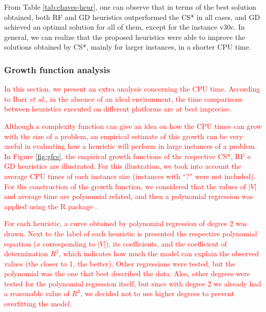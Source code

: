 \documentclass{ro}
\begin{document}
From Table \ref{tab:chaves-heur}, one can observe that in terms of the best solution obtained,  both RF and GD heuristics outperformed the CS* in all cases, and GD achieved an optimal solution for all of them, except for the instance v30c. In general, we can realize that the proposed heuristics were able to improve the solutions obtained by CS*, mainly for  larger instances, in a shorter CPU time.


\subsubsection{Growth function analysis}

\textcolor{red}{In this section, we present an extra analysis concerning the CPU time. According to Barr \textit{et al.}\cite{barr2001guidelines}, in the absence of an ideal environment, the time comparisons between heuristics executed on different platforms are at best imprecise.}

\textcolor{red}{
Although a complexity function can give an idea on how the CPU times can grow with the size of a problem, an empirical estimate of this growth can be very useful in evaluating how a heuristic will perform in large instances of a problem. In Figure \ref{fig:gfcs}, the empirical growth functions of the respective CS*, RF e GD heuristics are illustrated. For this illustration, we took into account the average CPU times of each instance size (instances with ``?'' were not included). For the construction of the growth function, we considered that the values of $|V|$ and average time are polynomial related, and then a polynomial regression was applied using the R package \cite{r-package}.}

\textcolor{red}{
For each heuristic, a curve obtained by polynomial regression of degree 2 was drawn. Next to the label of each heuristic is presented the respective polynomial equation ($x$ corresponding to $|V|$), its coefficients, and the coefficient of determination $R^2$, which indicates how much the model can explain the observed values (the closer to 1, the better). Other regressions were tested, but the polynomial was the one that best described the data. Also, other degrees were tested for the polynomial regression itself, but since with degree 2 we already had a reasonable value of $R^2$, we decided not to use higher degrees to prevent overfitting the model.}
\end{document}
